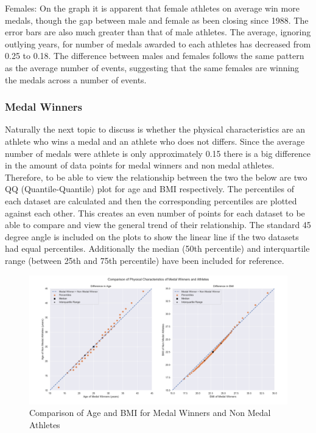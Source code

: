 \documentclass[a4 paper, 12pt]{article}
\begin{document}
        Females: On the graph it is apparent that female athletes on average win more medals, though the gap between male and female as been closing since 1988. The error bars are also much greater than that of male athletes. The average, ignoring outlying years, for number of medals awarded to each athletes has decreased from 0.25 to 0.18. The difference between males and females follows the same pattern as the average number of events, suggesting that the same females are winning the medals across a number of events. 

        \subsubsection{Medal Winners}
        Naturally the next topic to discuss is whether the physical characteristics are an athlete who wins a medal and an athlete who does not differs. Since the average number of medals were athlete is only approximately 0.15 there is a big difference in the amount of data points for medal winners and non medal athletes. Therefore, to be able to view the relationship between the two the below are two QQ (Quantile-Quantile) plot for age and BMI respectively. The percentiles of each dataset are calculated and then the corresponding percentiles are plotted against each other. This creates an even number of points for each dataset to be able to compare and view the general trend of their relationship. The standard 45 degree angle is included on the plots to show the linear line if the two datasets had equal percentiles. Additionally the median (50th percentile) and interquartile range (between 25th and 75th percentile) have been included for reference.
        \begin{figure} [H]
            \centering
            \includegraphics[width=\textwidth, frame]
                {./images/graph/athlete_difference_qqplot.png}      
                \caption{Comparison of Age and BMI for Medal Winners and Non Medal Athletes} 
        \end{figure}
        
\end{document}
